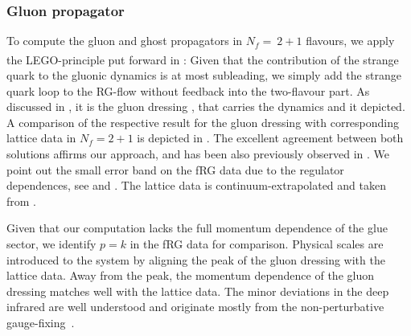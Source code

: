 \documentclass[aps,twocolumn,prd,superscriptaddress]{revtex4-2}
\newcommand{\LEGO}{LEGO\textsuperscript{\textregistered}}
\begin{document}
\subsubsection{Gluon propagator}
\label{sec:ResultsGluonProp}

To compute the gluon and ghost propagators in $N_f=~2+1$ flavours, we apply the \LEGO-principle put forward in : Given that the contribution of the strange quark to the gluonic dynamics is at most subleading, we simply add the strange quark loop to the RG-flow without feedback into the two-flavour part. 
As discussed in , it is the gluon dressing , that carries the dynamics and it depicted. A comparison of the respective result for the gluon dressing with corresponding lattice data in $N_f = 2+1$ is depicted in . The excellent agreement between both solutions affirms our approach, and has been also previously observed in \cite{Fu:2019hdw}. We point out the small error band on the fRG data due to the regulator dependences, see  and . The lattice data is continuum-extrapolated and taken from \cite{Zafeiropoulos:2019flq}.

Given that our computation lacks the full momentum dependence of the glue sector, we identify $p = k$ in the fRG data for comparison. Physical scales are introduced to the system by aligning the peak of the gluon dressing  with the lattice data. Away from the peak, the momentum dependence of the gluon dressing matches well with the lattice data. The minor deviations in the deep infrared are well understood and originate mostly from the non-perturbative gauge-fixing~\cite{Cyrol:2016tym, Cyrol:2017ewj, Maas:2019ggf, Pawlowski:2022oyq}. 
\end{document}
